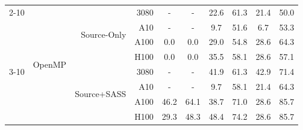 \begin{table}[]
{\begin{tabular}{@{}rrrrcc|cc|cc@{}}
\cmidrule(lr){2-10}
 & \multirow{8}{*}{OpenMP} & \multirow{4}{*}{Source-Only} & 3080 & \cellcolor[rgb]{1.000,1.000,1.000}- & \cellcolor[rgb]{1.000,1.000,1.000}- & \cellcolor[rgb]{1.000,0.907,0.907}22.6 & \cellcolor[rgb]{1.000,0.543,0.543}61.3 & \cellcolor[rgb]{1.000,0.915,0.915}21.4 & \cellcolor[rgb]{1.000,0.670,0.670}50.0 \\
 &  &  & A10 & \cellcolor[rgb]{1.000,1.000,1.000}- & \cellcolor[rgb]{1.000,1.000,1.000}- & \cellcolor[rgb]{1.000,0.976,0.976}9.7 & \cellcolor[rgb]{1.000,0.653,0.653}51.6 & \cellcolor[rgb]{1.000,0.987,0.987}6.7 & \cellcolor[rgb]{1.000,0.635,0.635}53.3 \\
 &  &  & A100 & \cellcolor[rgb]{1.000,1.000,1.000}0.0 & \cellcolor[rgb]{1.000,1.000,1.000}0.0 & \cellcolor[rgb]{1.000,0.862,0.862}29.0 & \cellcolor[rgb]{1.000,0.618,0.618}54.8 & \cellcolor[rgb]{1.000,0.865,0.865}28.6 & \cellcolor[rgb]{1.000,0.507,0.507}64.3 \\
 &  &  & H100 & \cellcolor[rgb]{1.000,1.000,1.000}0.0 & \cellcolor[rgb]{1.000,1.000,1.000}0.0 & \cellcolor[rgb]{1.000,0.809,0.809}35.5 & \cellcolor[rgb]{1.000,0.581,0.581}58.1 & \cellcolor[rgb]{1.000,0.865,0.865}28.6 & \cellcolor[rgb]{1.000,0.592,0.592}57.1 \\
\cmidrule(lr){3-10}
 &  & \multirow{4}{*}{Source+SASS} & 3080 & \cellcolor[rgb]{1.000,1.000,1.000}- & \cellcolor[rgb]{1.000,1.000,1.000}- & \cellcolor[rgb]{1.000,0.751,0.751}41.9 & \cellcolor[rgb]{1.000,0.543,0.543}61.3 & \cellcolor[rgb]{1.000,0.742,0.742}42.9 & \cellcolor[rgb]{1.000,0.417,0.417}71.4 \\
 &  &  & A10 & \cellcolor[rgb]{1.000,1.000,1.000}- & \cellcolor[rgb]{1.000,1.000,1.000}- & \cellcolor[rgb]{1.000,0.976,0.976}9.7 & \cellcolor[rgb]{1.000,0.581,0.581}58.1 & \cellcolor[rgb]{1.000,0.915,0.915}21.4 & \cellcolor[rgb]{1.000,0.507,0.507}64.3 \\
 &  &  & A100 & \cellcolor[rgb]{1.000,0.709,0.709}46.2 & \cellcolor[rgb]{1.000,0.509,0.509}64.1 & \cellcolor[rgb]{1.000,0.781,0.781}38.7 & \cellcolor[rgb]{1.000,0.422,0.422}71.0 & \cellcolor[rgb]{1.000,0.865,0.865}28.6 & \cellcolor[rgb]{1.000,0.219,0.219}85.7 \\
 &  &  & H100 & \cellcolor[rgb]{1.000,0.860,0.860}29.3 & \cellcolor[rgb]{1.000,0.688,0.688}48.3 & \cellcolor[rgb]{1.000,0.687,0.687}48.4 & \cellcolor[rgb]{1.000,0.380,0.380}74.2 & \cellcolor[rgb]{1.000,0.865,0.865}28.6 & \cellcolor[rgb]{1.000,0.219,0.219}85.7 \\
\bottomrule
\end{tabular}
}
\end{table}
